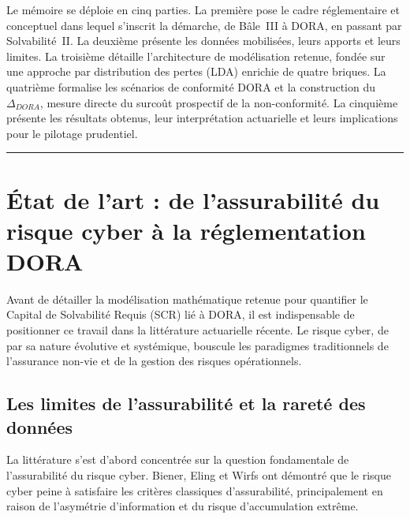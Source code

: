 \documentclass[11pt,a4paper]{article}
\theoremstyle{navystyle}
\theoremstyle{navydef}
\begin{document}
Le mémoire se déploie en cinq parties. La première pose le cadre
réglementaire et conceptuel dans lequel s'inscrit la démarche, de Bâle~III à
DORA, en passant par Solvabilité~II. La deuxième présente les données
mobilisées, leurs apports et leurs limites. La troisième détaille
l'architecture de modélisation retenue, fondée sur une approche par
distribution des pertes (LDA) enrichie de quatre briques. La quatrième
formalise les scénarios de conformité DORA et la construction du
$\Delta_{DORA}$, mesure directe du surcoût prospectif de la non-conformité.
La cinquième présente les résultats obtenus, leur interprétation actuarielle
et leurs implications pour le pilotage prudentiel.

\vspace{0.5em}
\noindent\rule{\textwidth}{0.8pt}
\vspace{0.8em}

\section*{État de l'art : de l'assurabilité du risque cyber à la réglementation DORA}

Avant de détailler la modélisation mathématique retenue pour quantifier le Capital de Solvabilité Requis (SCR) lié à DORA, il est indispensable de positionner ce travail dans la littérature actuarielle récente. Le risque cyber, de par sa nature évolutive et systémique, bouscule les paradigmes traditionnels de l'assurance non-vie et de la gestion des risques opérationnels. 

\subsection{Les limites de l'assurabilité et la rareté des données}

La littérature s'est d'abord concentrée sur la question fondamentale de l'assurabilité du risque cyber. Biener, Eling et Wirfs \citep{BienerElingWirfs2015} ont démontré que le risque cyber peine à satisfaire les critères classiques d'assurabilité, principalement en raison de l'asymétrie d'information et du risque d'accumulation extrême.
\end{document}
